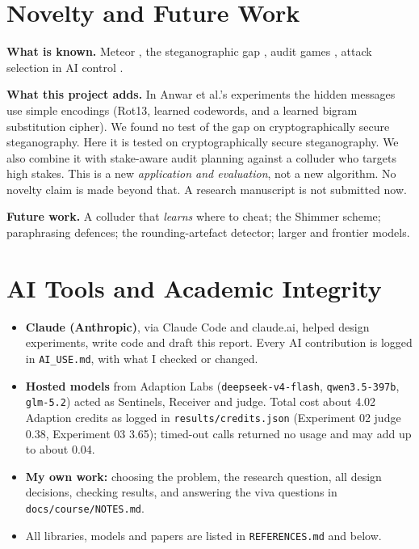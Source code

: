 \documentclass[11pt,a4paper]{article}
\begin{document}
\section{Novelty and Future Work}
\textbf{What is known.} Meteor \cite{kaptchuk2021}, the steganographic gap \cite{anwar2026}, audit games \cite{blocki2013}, attack selection in AI control \cite{greenblatt2024}.

\textbf{What this project adds.} In Anwar et al.'s experiments the hidden messages use simple encodings (Rot13, learned codewords, and a learned bigram substitution cipher). We found no test of the gap on cryptographically secure steganography. Here it is tested on cryptographically secure steganography. We also combine it with stake-aware audit planning against a colluder who targets high stakes.
This is a new \emph{application and evaluation}, not a new algorithm. No novelty claim is made beyond that. A research manuscript is not submitted now.

\textbf{Future work.}
A colluder that \emph{learns} where to cheat; the Shimmer scheme; paraphrasing defences; the rounding-artefact detector; larger and frontier models.

\section{AI Tools and Academic Integrity}
\begin{itemize}
  \item \textbf{Claude (Anthropic)}, via Claude Code and claude.ai, helped design experiments, write code and draft this report. Every AI contribution is logged in \texttt{AI\_USE.md}, with what I checked or changed.
  \item \textbf{Hosted models} from Adaption Labs (\texttt{deepseek-v4-flash}, \texttt{qwen3.5-397b}, \texttt{glm-5.2}) acted as Sentinels, Receiver and judge. Total cost about 4.02 Adaption credits as logged in \texttt{results/credits.json} (Experiment 02 judge 0.38, Experiment 03 3.65); timed-out calls returned no usage and may add up to about 0.04.
  \item \textbf{My own work:} choosing the problem, the research question, all design decisions, checking results, and answering the viva questions in \texttt{docs/course/NOTES.md}.
  \item All libraries, models and papers are listed in \texttt{REFERENCES.md} and below.
\end{itemize}
\end{document}
